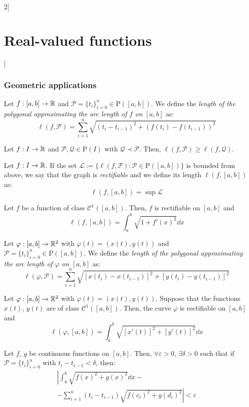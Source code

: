 \documentclass[../../../main.tex]{subfiles}
\begin{document}
\begin{multicols}{2}[\section{Real-valued functions}]
\subsubsection*{Geometric applications}
\begin{definition}
    Let $f:[a,b]\rightarrow\mathbb{R}$ and $\mathcal{P}=\{t_i\}_{i=0}^n\in\mathrm{P}([a,b])$. We define the \textit{length of the polygonal approximating the arc length of $f$ on $[a,b]$} as: $$\ell(f,\mathcal{P})=\sum_{i=1}^n\sqrt{{(t_i-t_{i-1})}^2+{(f(t_i)-f(t_{i-1}))}^2}$$
\end{definition}
\begin{lemma}
    Let $f:I\rightarrow\mathbb{R}$ and $\mathcal{P},\mathcal{Q}\in\mathrm{P}(I)$ with $\mathcal{Q}\prec\mathcal{P}$. Then, $\ell(f,\mathcal{P})\geq \ell(f,\mathcal{Q})$.
\end{lemma}
\begin{definition}
    Let $f:I\rightarrow\mathbb{R}$. If the set $\mathcal{L}:=\{\ell(f,\mathcal{P}):\mathcal{P}\in\mathrm{P}([a,b])\}$ is bounded from above, we say that the graph is \textit{rectifiable} and we define its length $\ell(f,[a,b])$ as: $$\ell(f,[a,b])=\sup \mathcal{L}$$
\end{definition}
\begin{prop}
    Let $f$ be a function of class $\mathcal{C}^1([a,b])$. Then, $f$ is rectifiable on $[a,b]$ and $$\ell(f,[a,b])=\int_a^b\sqrt{1+{f'(x)}^2}\dd x$$
\end{prop}
\begin{definition}
    Let $\varphi:[a,b]\rightarrow\mathbb{R}^2$ with $\varphi(t)=(x(t),y(t))$ and $\mathcal{P}=\{t_i\}_{i=0}^n\in\mathrm{P}([a,b])$. We define the \textit{length of the polygonal approximating the arc length of $\varphi$ on $[a,b]$} as: $$\ell(\varphi,\mathcal{P})=\sum_{i=1}^n\sqrt{{[x(t_i)-x(t_{i-1})]}^2+{[y(t_i)-y(t_{i-1})]}^2}$$
\end{definition}
\begin{prop}
    Let $\varphi:[a,b]\rightarrow\mathbb{R}^2$ with $\varphi(t)=(x(t),y(t))$. Suppose that the functions $x(t)$, $y(t)$ are of class $\mathcal{C}^1([a,b])$. Then, the curve $\varphi$ is rectifiable on $[a,b]$ and $$\ell(\varphi,[a,b])=\int_a^b\sqrt{{[x'(t)]}^2+{[y'(t)]}^2}\dd x$$
\end{prop}
\begin{lemma}
    Let $f$, $g$ be continuous functions on $[a,b]$. Then, $\forall\varepsilon>0$, $\exists\delta>0$ such that if $\mathcal{P}=\{t_i\}_{i=0}^n$ with $t_i-t_{i-1}<\delta$, then: 
    \begin{multline*}
        \left|\int_a^b\sqrt{{f(x)}^2+{g(x)}^2}\dd x\right.-\\-\left.\sum_{i=1}^n(t_i-t_{i-1})\sqrt{{f(c_i)}^2+{g(d_i)}^2}\right|<\varepsilon

\end{multline*}
\end{lemma}
\end{multicols}
\end{document}

